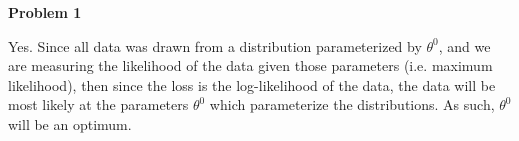 \textbf{Problem 1}

Yes. Since all data was drawn from a distribution parameterized by $\theta^0$, and we are measuring the likelihood of the data given those parameters (i.e. maximum likelihood), then since the loss is the log-likelihood of the data, the data will  be most likely at the parameters $\theta^0$ which parameterize the distributions. As such, $\theta^0$ will be an optimum.
